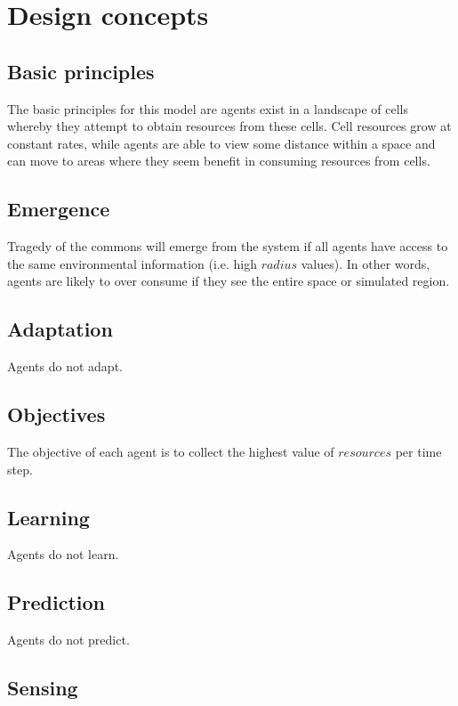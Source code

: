 \documentclass[11pt,a4paper,twocolumn,notitlepage]{article}
\begin{document}
\section{Design concepts}

\subsection{Basic principles}

The basic principles for this model are agents exist in a landscape of cells whereby they attempt to obtain resources from these cells. Cell resources grow at constant rates, while agents are able to view some distance within a space and can move to areas where they seem benefit in consuming resources from cells.

\subsection{Emergence}

Tragedy of the commons will emerge from the system if all agents have access to the same environmental information (i.e. high $radius$ values). In other words, agents are likely to over consume if they see the entire space or simulated region.

\subsection{Adaptation}

Agents do not adapt.

\subsection{Objectives}

The objective of each agent is to collect the highest value of $resources$ per time step.

\subsection{Learning}

Agents do not learn.

\subsection{Prediction}

Agents do not predict.

\subsection{Sensing}
\end{document}
